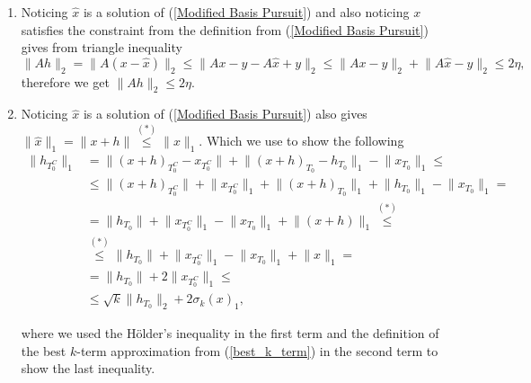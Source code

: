 \documentclass[11pt,oneside,czech,american]{book} %
\theoremstyle{plain}
\theoremstyle{definition}
\begin{document}
\begin{enumerate}
	\item Noticing $\hat{x}$ is a solution of (\ref{Modified Basis Pursuit}) and also noticing $x$ satisfies the constraint from the definition from (\ref{Modified Basis Pursuit}) gives from triangle inequality
	\begin{equation}
		\lVert Ah \rVert_2 = \lVert A (x-\hat{x}) \rVert_2 \leq \lVert Ax - y - A\hat{x} + y \rVert_2 \leq \lVert Ax - y \rVert_2 + \lVert A\hat{x} - y \rVert_2 \leq 2 \eta,
		\label{short_shit}
	\end{equation}
	therefore we get $\lVert Ah \rVert_2 \leq 2 \eta$.
	\item Noticing $\hat{x}$ is a solution of (\ref{Modified Basis Pursuit}) also gives $\lVert \hat{x} \rVert_1 = \lVert x + h \rVert \stackrel{(*)}{\leq} \lVert x \rVert_1$. Which we use to show the following
	\begin{equation}
		\begin{aligned}
			\lVert h_{T^C_0} \rVert_1 &= \lVert (x+h)_{T^C_0} - x_{T^C_0} \rVert + \lVert (x+h)_{T_0} - h_{T_0} \rVert_1 - \lVert x_{T_0} \rVert_1 \leq \\
			&\leq \lVert (x+h)_{T^C_0} \rVert + \lVert x_{T^C_0} \rVert_1 + \lVert (x+h)_{T_0} \rVert_1 + \lVert h_{T_0} \rVert_1 - \lVert x_{T_0} \rVert_1 = \\
		&= \lVert h_{T_0} \rVert + \lVert x_{T^C_0} \rVert_1 - \lVert x_{T_0} \rVert_1  + \lVert(x+h)\rVert_1 \stackrel{(*)}{\leq} \\
		&\stackrel{(*)}{\leq} \lVert h_{T_0} \rVert + \lVert x_{T^C_0} \rVert_1 - \lVert x_{T_0} \rVert_1  + \lVert x \rVert_1 = \\
		&= \lVert h_{T_0} \rVert + 2 \lVert x_{T^C_0} \rVert_1 \leq \\
		&\leq \sqrt{k} \lVert h_{T_0} \rVert_2 + 2\sigma_k(x)_1,
		\end{aligned}
	\label{long_shit}
	\end{equation}

where we used the Hölder's inequality in the first term and the definition of the best $k$-term approximation from (\ref{best_k_term}) in the second term to show the last inequality.


\end{enumerate}
\end{document}
